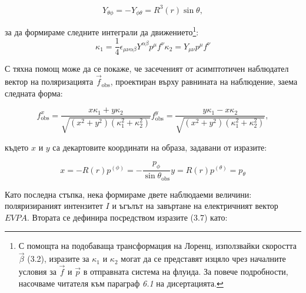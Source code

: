 \documentclass[12pt]{article}
\numberwithin{equation}{section}
\numberwithin{figure}{section}
\begin{document}
	\begin{equation}
		Y_{\theta\phi} = -Y_{\phi\theta} = R^3(r)\sin\theta,
	\end{equation}
	
	\noindent за да формираме следните интеграли да движението\footnote{С помощта на подобаваща трансформация на Лоренц, използвайки скоростта $\vec{\beta}$ (3.2), изразите за $\kappa_1$ и $\kappa_2$ могат да се представят изцяло чрез началните условия за $\vec{f}$ и $\vec{p}$ в отправната система на флуида. За повече подробности, насочваме читателя към параграф \emph{6.1} на дисертацията.}:
	\begin{subequations}
		\begin{equation}
			\kappa_1 = \frac{1}{4}\epsilon_{\mu\nu\alpha\beta}Y^{\alpha\beta}p^\mu f^\nu
		\end{equation}
		\begin{equation}
			\kappa_2 = Y_{\mu\nu}p^\mu f^\nu
		\end{equation}
	\end{subequations}

	С тяхна помощ може да се покаже, че засеченият от асимптотичен наблюдател вектор на поляризацията $\vec{f}_\text{obs}$, проектиран върху равнината на наблюдение, заема следната форма:
	
	\begin{subequations}
		\begin{equation}
			f^x_\text{obs} = \frac{x\kappa_1 + y\kappa_2}{\sqrt{(x^2 + y^2)(\kappa_1^2 + \kappa_2^2)}}
		\end{equation}
		\begin{equation}
			f^y_\text{obs} = \frac{y \kappa_1 - x\kappa_2}{\sqrt{(x^2 + y^2)(\kappa_1^2 + \kappa_2^2)}},
		\end{equation}
	\end{subequations}
	
	където $x$ и $y$ са декартовите координати на образа, задавани от изразите:
	
	\begin{subequations}
		\begin{equation}
			x = -R(r)p^{(\phi)} = -\frac{p_\phi}{\sin\theta_\text{obs}}
		\end{equation}
		\begin{equation}
			y = R(r)p^{(\theta)} = p_\theta
		\end{equation}
	\end{subequations}
	
	Като последна стъпка, нека формираме двете наблюдаеми величини: поляризираният интензитет $I$ и ъгълът на завъртане на електричният вектор $EVPA$. Втората се дефинира посредством изразите (3.7) като:
	
\end{document}

